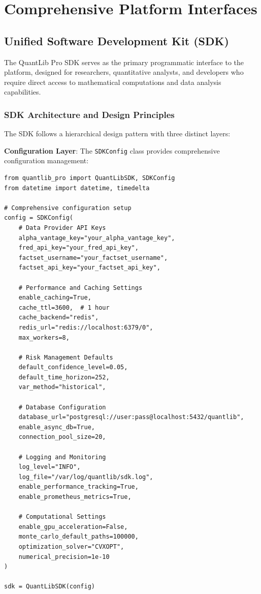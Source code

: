 \documentclass[12pt,a4paper]{article}
\theoremstyle{definition}
\theoremstyle{remark}
\begin{document}
\section{Comprehensive Platform Interfaces}

\subsection{Unified Software Development Kit (SDK)}

The QuantLib Pro SDK serves as the primary programmatic interface to the platform, designed for researchers, quantitative analysts, and developers who require direct access to mathematical computations and data analysis capabilities.

\subsubsection{SDK Architecture and Design Principles}

The SDK follows a hierarchical design pattern with three distinct layers:

\textbf{Configuration Layer}: The \texttt{SDKConfig} class provides comprehensive configuration management:
\begin{lstlisting}[caption=Advanced SDK Configuration]
from quantlib_pro import QuantLibSDK, SDKConfig
from datetime import datetime, timedelta

# Comprehensive configuration setup
config = SDKConfig(
    # Data Provider API Keys
    alpha_vantage_key="your_alpha_vantage_key",
    fred_api_key="your_fred_api_key",
    factset_username="your_factset_username",
    factset_api_key="your_factset_api_key",
    
    # Performance and Caching Settings
    enable_caching=True,
    cache_ttl=3600,  # 1 hour
    cache_backend="redis",
    redis_url="redis://localhost:6379/0",
    max_workers=8,
    
    # Risk Management Defaults
    default_confidence_level=0.05,
    default_time_horizon=252,
    var_method="historical",
    
    # Database Configuration
    database_url="postgresql://user:pass@localhost:5432/quantlib",
    enable_async_db=True,
    connection_pool_size=20,
    
    # Logging and Monitoring
    log_level="INFO",
    log_file="/var/log/quantlib/sdk.log",
    enable_performance_tracking=True,
    enable_prometheus_metrics=True,
    
    # Computational Settings
    enable_gpu_acceleration=False,
    monte_carlo_default_paths=100000,
    optimization_solver="CVXOPT",
    numerical_precision=1e-10
)

sdk = QuantLibSDK(config)
\end{lstlisting}
\end{document}
